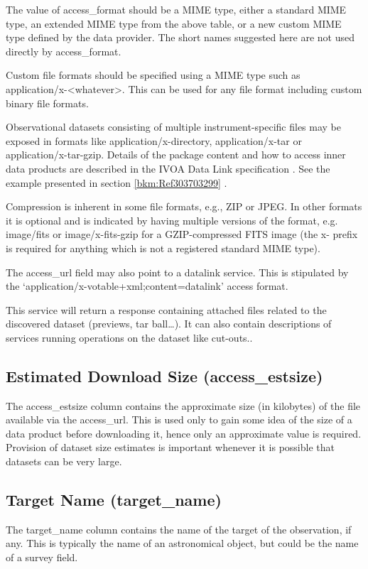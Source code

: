 \documentclass[11pt,a4paper]{ivoa}
\begin{document}
The value of access\_format should be a MIME type, either a standard MIME type, an extended MIME type from the above
table, or a new custom MIME type defined by the data provider.  The short names suggested here are not used directly by
access\_format.

Custom file formats should be specified using a MIME type such as
{\textquotedbl}application/x-{\textless}whatever{\textgreater}{\textquotedbl}.  This can be used for any file format
including custom binary file formats.

Observational datasets consisting of multiple instrument-specific files may be exposed in formats like
application/x-directory, application/x-tar or application/x-tar-gzip.  Details of the package content and how to access
inner data products are described in the IVOA Data Link specification \citep{2015ivoa.spec.0617D}. See the example
presented in section \ref{bkm:Ref303703299} .

Compression is inherent in some file formats, e.g., ZIP or JPEG.  In other formats it is optional and is indicated by
having multiple versions of the format, e.g. image/fits or image/x-fits-gzip for a GZIP-compressed FITS image (the
{\textquotedbl}x-{\textquotedbl} prefix is required for anything which is not a registered standard MIME type).

The access\_url field may also point to a datalink service. This is stipulated by the
`application/x-votable+xml;content=datalink' access format.

This service will return a response containing attached files related to the discovered dataset (previews, tar
ball{\dots}).  It can also contain descriptions of services running operations on the dataset like cut-outs..

\subsection{Estimated Download Size (access\_estsize)}
The access\_estsize column contains the approximate size (in kilobytes) of the file available via the access\_url.  This
is used only to gain some idea of the size of a data product before downloading it, hence only an approximate value is
required.  Provision of dataset size estimates is important whenever it is possible that datasets can be very large.

\subsection{Target Name (target\_name)}
The target\_name column contains the name of the target of the observation, if any.  This is typically the name of an
astronomical object, but could be the name of a survey field.
\end{document}
